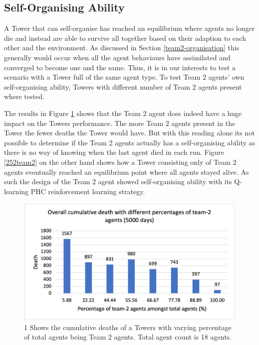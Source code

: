 \subsection{Self-Organising Ability}
A Tower that can self-organise has reached an equilibrium where agents no longer die and instead are able to survive all together based on their adaption to each other and the environment. As discussed in Section \ref{team2-organisation} this generally would occur when all the agent behaviours have assimilated and converged to become one and the same. Thus, it is in our interests to test a scenario with a Tower full of the same agent type. To test Team 2 agents’ own self-organising ability, Towers with different number of Team 2 agents present where tested.

The results in Figure \ref{251team2} shows that the Team 2 agent does indeed have a huge impact on the Towers performance. The more Team 2 agents present in the Tower the fewer deaths the Tower would have. But with this reading alone its not possible to determine if the Team 2 agents actually has a self-organising ability as there is no way of knowing when the last agent died in each run. Figure \ref{252team2} on the other hand shows how a Tower consisting only of Team 2 agents eventually reached an equilibrium point where all agents stayed alive. As such the design of the Team 2 agent showed self-organising ability with its Q-learning PHC reinforcement learning strategy.

\begin{figure}
\centering
\includegraphics{004_team_2_agent_design/251team2}
\caption{1 Shows the cumulative deaths of a Towers with varying percentage of total agents being Team 2 agents. Total agent count is 18 agents.}
\label{251team2}
\end{figure}

